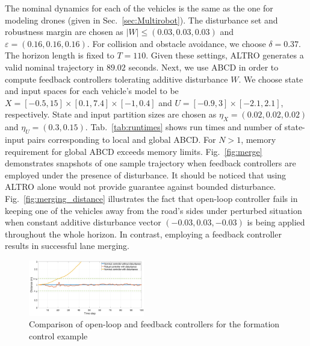 The nominal dynamics for each of the vehicles is the same as the one  for modeling drones (given in Sec.~\ref{sec:Multirobot}). 
The disturbance set and robustness margin are chosen as $|W|\leq (0.03,0.03,0.03)$ and $\varepsilon=(0.16,0.16,0.16)$. %
For collision and obstacle avoidance, we choose $\delta=0.37$.
The horizon length is fixed to $T=110$. 
Given these settings, ALTRO generates a valid nominal trajectory in $89.02$ seconds. 
Next, we use ABCD in order to compute feedback controllers tolerating additive disturbance $W$. 
We choose state and input spaces for each vehicle's model to be $X=[-0.5,15]\times[0.1,7.4]\times[-1,0.4]$ and $U=[-0.9,3]\times[-2.1,2.1]$, respectively. 
State and input partition sizes are chosen as $\eta_{X}=(0.02,0.02,0.02)$ and $\eta_{U}=(0.3,0.15)$. 
Tab.~\ref{tab:runtimes} shows run times and number of state-input pairs corresponding to local and global ABCD. 
For $N>1$, memory requirement for global ABCD exceeds memory limits.
Fig.~\ref{fig:merge} demonstrates snapshots of one sample trajectory when feedback controllers are employed under the presence of disturbance. It should be noticed that using ALTRO alone would not provide guarantee against bounded disturbance.
Fig.~\ref{fig:merging_distance} illustrates the fact that open-loop controller fails in keeping one of the vehicles away from the road's sides under perturbed situation when constant additive disturbance vector $(-0.03 ,0.03,-0.03)$ is being applied throughout the whole horizon. 
In contrast, employing a feedback controller results in successful lane merging. 





\begin{figure}[t]
	\centering
	\includegraphics[width=0.45\textwidth]{figures/formation_dist2.eps}
	\caption{Comparison of open-loop and feedback controllers for the formation control example}
	\label{fig:formation_distance}
	\vspace*{-0.5cm}
\end{figure}

